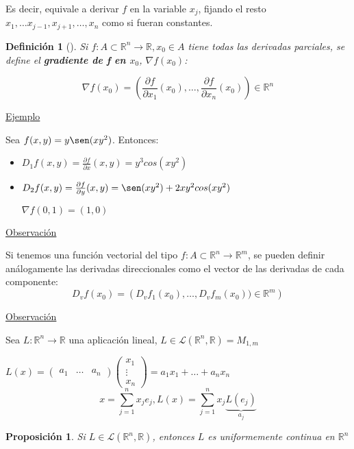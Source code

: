 \documentclass[10pt,a4paper,openright]{book}
\theoremstyle{break}
\newtheorem*{defi}{Definición}
\newtheorem*{prop}{Proposición}
\begin{document}
Es decir, equivale a derivar $f$ en la variable $x_j$, fijando el resto $x_1, \ldots x_{j-1}, x_{j+1}, \ldots, x_n$ como si fueran constantes.



\begin{defi}[]
Si $f: A \subset \mathbb{R}^n \to \mathbb{R}, x_0 \in A$ tiene todas las derivadas parciales, se define el \textbf{gradiente de f en $x_0$}, $\nabla f(x_0)$:

$$\nabla f(x_0) = \left( \frac{\partial f}{\partial x_1} (x_0), \ldots, \frac{\partial f}{\partial x_n} (x_0) \right) \in  \mathbb{R}^n$$
\end{defi}

\underline{Ejemplo}

Sea $f(x,y) = y \sen(xy^2)$. Entonces:
\begin{itemize}
\item $D_1 f(x,y) = \frac{\partial f}{\partial x} (x,y) = y^3 cos(xy^2)$
\item $D_2 f(x,y) = \frac{\partial f}{\partial y} (x,y) = \sen(xy^2) + 2xy^2 cos(xy^2)$

$\nabla f(0,1) = (1,0)$
\end{itemize}

\underline{Observación}

Si tenemos una función vectorial del tipo $f: A \subset \mathbb{R}^n \to \mathbb{R}^m$, se pueden definir análogamente las derivadas direccionales como el vector de las derivadas de cada componente:
$$D_v f(x_0) = \left( D_v f_1(x_0), \ldots, D_v f_m(x_0)) \in \mathbb{R}^m \right)$$

\underline{Observación}

Sea $L: \mathbb{R}^n \to \mathbb{R}$ una aplicación lineal, $L \in \mathcal{L}(\mathbb{R}^n, \mathbb{R}) = M_{1,m}$

$L(x) = \begin{pmatrix}
a_1 & \ldots & a_n
\end{pmatrix} \begin{pmatrix}
x_1 \\ \vdots \\ x_n
\end{pmatrix}
 = a_1 x_1 + \ldots + a_n x_n$
$$x = \sum_{j=1}^{n} x_j e_j , L(x) = \sum_{j=1}^{n} x_j \underbrace{L(e_j)}_{a_j}$$

\begin{prop}
Si $L \in \mathcal{L} (\mathbb{R}^n, \mathbb{R})$, entonces $L$ es uniformemente continua en $\mathbb{R}^n$
\end{prop}
\end{document}
